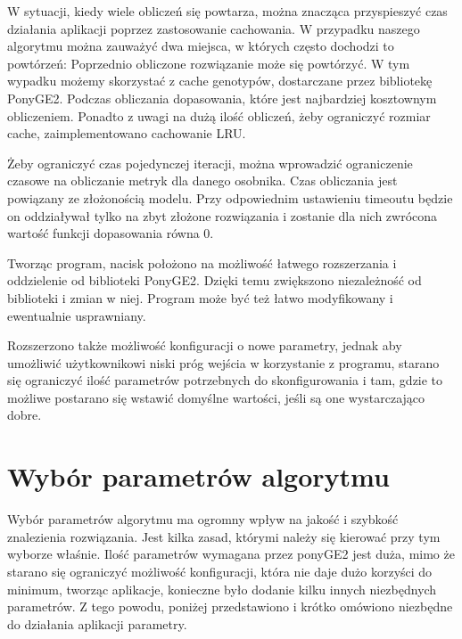 W sytuacji, kiedy wiele obliczeń się powtarza, można znacząca przyspieszyć czas działania aplikacji poprzez zastosowanie cachowania. W przypadku naszego algorytmu można zauważyć dwa miejsca, w których często dochodzi to powtórzeń:
Poprzednio obliczone rozwiązanie może się powtórzyć. W tym wypadku możemy skorzystać z cache genotypów, dostarczane przez bibliotekę PonyGE2.
Podczas obliczania dopasowania, które jest najbardziej kosztownym obliczeniem. Ponadto z uwagi na dużą ilość obliczeń, żeby ograniczyć rozmiar cache, zaimplementowano cachowanie LRU.

Żeby ograniczyć czas pojedynczej iteracji, można wprowadzić ograniczenie czasowe na obliczanie metryk dla danego osobnika. Czas obliczania jest powiązany ze złożonością modelu. Przy odpowiednim ustawieniu timeoutu będzie on oddziaływał tylko na zbyt złożone rozwiązania i zostanie dla nich zwrócona wartość funkcji dopasowania równa 0.

Tworząc program, nacisk położono na możliwość łatwego rozszerzania i oddzielenie od biblioteki PonyGE2. Dzięki temu zwiększono niezależność od biblioteki i zmian w niej. Program może być też łatwo modyfikowany i ewentualnie usprawniany. 

Rozszerzono także możliwość konfiguracji o nowe parametry, jednak aby umożliwić użytkownikowi niski próg wejścia w korzystanie z programu, starano się ograniczyć ilość parametrów potrzebnych do skonfigurowania i tam, gdzie to możliwe postarano się wstawić domyślne wartości, jeśli są one wystarczająco dobre. 

\section{Wybór parametrów algorytmu}
Wybór parametrów algorytmu ma ogromny wpływ na jakość i szybkość znalezienia rozwiązania. Jest kilka zasad, którymi należy się kierować przy tym wyborze właśnie. Ilość parametrów wymagana przez ponyGE2 jest duża, mimo że starano się ograniczyć możliwość konfiguracji, która nie daje dużo korzyści do minimum, tworząc aplikacje, konieczne było dodanie kilku innych niezbędnych parametrów. Z tego powodu, poniżej przedstawiono i krótko omówiono niezbędne do działania aplikacji parametry.

